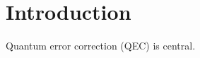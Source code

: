\documentclass{article}
\begin{document}
\begin{abstract}We study quantum error correction (QEC). QEC matters.\end{abstract}
\section{Introduction}Quantum error correction (QEC) is central.
\end{document}
